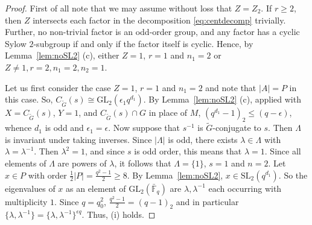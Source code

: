 \documentclass{amsart}
\theoremstyle{plain}\newtheorem{Theorem}{Theorem}[section]
\theoremstyle{plain}\newtheorem{Conjecture}[Theorem]{Conjecture}
\theoremstyle{plain}\newtheorem{Corollary}[Theorem]{Corollary}
\theoremstyle{plain}\newtheorem{Lemma}[Theorem]{Lemma}
\theoremstyle{plain}\newtheorem{Proposition}[Theorem]{Proposition}
\theoremstyle{definition}\newtheorem{Definition}[Theorem]{Definition}
\theoremstyle{definition}\newtheorem{Example}[Theorem]{Example}
\theoremstyle{definition}\newtheorem{Examples}[Theorem]{Examples}
\theoremstyle{definition}\newtheorem{Exercise}[Theorem]{Exercise}
\theoremstyle{definition}\newtheorem{Notation}[Theorem]{Notation}
\theoremstyle{definition}\newtheorem{Remark}[Theorem]{Remark}
\theoremstyle{definition}\newtheorem{Remarks}[Theorem]{Remarks}
\def\GL{\mathrm{GL}}
\def\SL{\mathrm{SL}}
\newcommand{\wt}{\widetilde}
\numberwithin{equation}{section}
\begin{document}
\begin{proof} First of all note that we may assume without loss that $Z=Z_2$. 
  If $r \geq 2$, then $Z$ intersects each factor  in the decomposition \eqref{eq:centdecomp} trivially. Further, no  non-trivial factor is an odd-order group, and any factor has a cyclic Sylow $2$-subgroup  if and only if the factor itself is cyclic. Hence, by  Lemma~\ref{lem:noSL2} (c),  either  $Z=1 $,  $r=1$ and $n_1=2 $  or  $Z\ne 1,  r=2, n_1=2, n_2=1 $. 
   
 Let us  first consider the case  $Z=1 $,  $r=1$ and $n_1=2 $ and note that $|A|=P$ in this case.   So, $C_{\wt{G}}(s)\cong \GL_2 (\epsilon_1 q^{d_1}) $. By Lemma~\ref{lem:noSL2} (c), applied with  $X= C_{\wt{G}}(s)$, $Y=1 $, and  $C_{\wt{G}} (s) \cap G$ in place of  $M$, $(q^{d_1} -1)_2 \leq  (q -\epsilon)  $, whence $d_1$ is odd and $\epsilon_1=\epsilon$.  Now suppose that  $s^{-1}$ is $\wt{G}$-conjugate to $s$. Then  $\Lambda $ is invariant under taking inverses.   Since $|\Lambda|$  is odd, there exists $\lambda \in \Lambda$  with $\lambda= \lambda^{-1}$.  Then $\lambda^2=1$, and since $s$ is  odd order, this means that $\lambda =1 $.   Since all elements of $\Lambda$ are  powers of $\lambda $, it follows that $\Lambda =\{1\}$,  $s=1 $ and $n=2$.  Let $x \in P $  with   order $\frac{1}{2}  |P|  = \frac{q^2-1}{2} \geq 8$. By Lemma~\ref{lem:noSL2},  $x \in \SL_2(q^{d_1})$. So the  eigenvalues of  $x$ as  an element of  $\GL_2(\bar {\mathbb F}_q)$ are $\lambda, \lambda^{-1}$ each occurring with  multiplicity  $1$.  Since $q=q_0^2 $, $ \frac{q^2-1}{2}  = (q-1)_2  $  and in particular $\{ \lambda, \lambda^{-1} \}   =  
  \{ \lambda, \lambda^{-1} \} ^{\epsilon q}$.   Thus,   (i) holds.
 

\end{proof}
\end{document}
